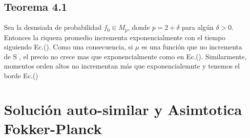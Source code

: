 \documentclass[12pt]{article}
\begin{document}
\subsection*{Teorema 4.1}
Sea la desnsiada de probabilidad $f_0\in M_p$, donde $p=2+\delta$ para algún $\delta > 0$. Entonces la riqueza promedio incrementa exponencialmente con el tiempo siguiendo Ec.(\cite{ec36}). Como una consecuencia, si $\mu$ es una función que no incrementa de S
, el precio no crece mas que exponencialmente como en Ec.(\cite{ec37}). Similarmente, momentos orden altos no incrementan más que exponencialemnte y tenemos el borde Ec.(\cite{ec41})
\section*{Solución auto-similar y Asimtotica Fokker-Planck}
\end{document}
